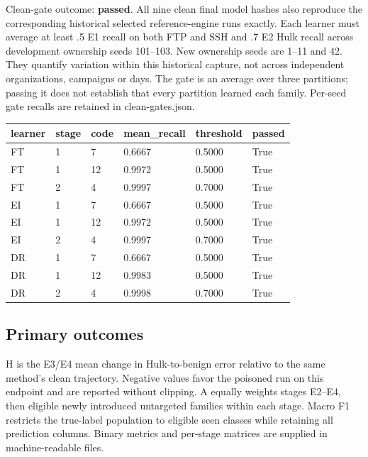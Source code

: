 \documentclass[
  10pt,
  a4paper,
]{article}
\begin{document}
Clean-gate outcome: \textbf{passed}. All nine clean final model hashes
also reproduce the corresponding historical selected reference-engine
runs exactly. Each learner must average at least .5 E1 recall on both
FTP and SSH and .7 E2 Hulk recall across development ownership seeds
101--103. New ownership seeds are 1--11 and 42. They quantify variation
within this historical capture, not across independent organizations,
campaigns or days. The gate is an average over three partitions; passing
it does not establish that every partition learned each family. Per-seed
gate recalls are retained in clean-gates.json.

\begin{longtable}[]{@{}llllll@{}}
\toprule
learner & stage & code & mean\_recall & threshold & passed \\
\midrule
\endhead
FT & 1 & 7 & 0.6667 & 0.5000 & True \\
FT & 1 & 12 & 0.9972 & 0.5000 & True \\
FT & 2 & 4 & 0.9997 & 0.7000 & True \\
EI & 1 & 7 & 0.6667 & 0.5000 & True \\
EI & 1 & 12 & 0.9972 & 0.5000 & True \\
EI & 2 & 4 & 0.9997 & 0.7000 & True \\
DR & 1 & 7 & 0.6667 & 0.5000 & True \\
DR & 1 & 12 & 0.9983 & 0.5000 & True \\
DR & 2 & 4 & 0.9998 & 0.7000 & True \\
\bottomrule
\end{longtable}

\hypertarget{primary-outcomes}{%
\subsection{Primary outcomes}\label{primary-outcomes}}

H is the E3/E4 mean change in Hulk-to-benign error relative to the same
method's clean trajectory. Negative values favor the poisoned run on
this endpoint and are reported without clipping. A equally weights
stages E2--E4, then eligible newly introduced untargeted families within
each stage. Macro F1 restricts the true-label population to eligible
seen classes while retaining all prediction columns. Binary metrics and
per-stage matrices are supplied in machine-readable files.
\end{document}
